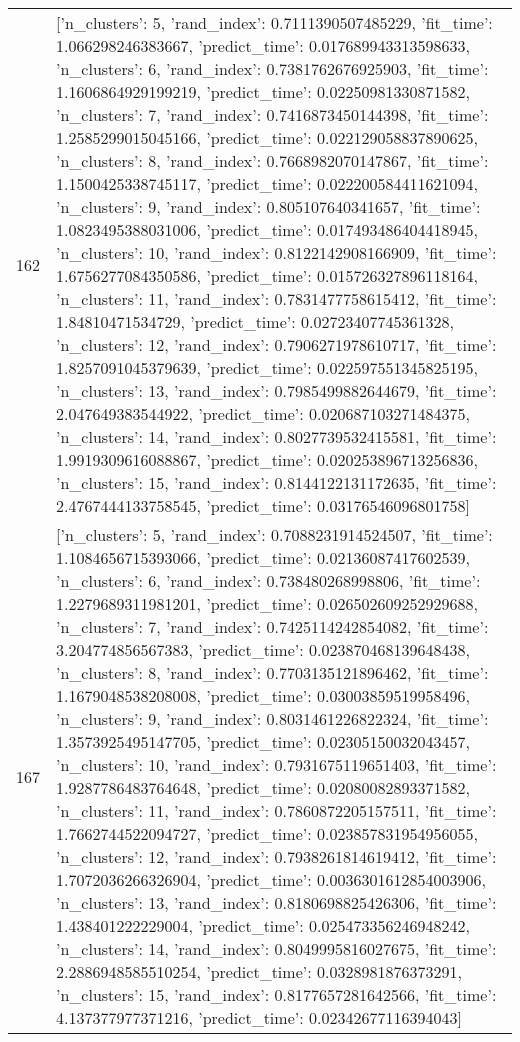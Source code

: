 \begin{tabular}{rl}
162 & [{'n_clusters': 5, 'rand_index': 0.7111390507485229, 'fit_time': 1.066298246383667, 'predict_time': 0.017689943313598633}, {'n_clusters': 6, 'rand_index': 0.7381762676925903, 'fit_time': 1.1606864929199219, 'predict_time': 0.02250981330871582}, {'n_clusters': 7, 'rand_index': 0.7416873450144398, 'fit_time': 1.2585299015045166, 'predict_time': 0.022129058837890625}, {'n_clusters': 8, 'rand_index': 0.7668982070147867, 'fit_time': 1.1500425338745117, 'predict_time': 0.022200584411621094}, {'n_clusters': 9, 'rand_index': 0.805107640341657, 'fit_time': 1.0823495388031006, 'predict_time': 0.017493486404418945}, {'n_clusters': 10, 'rand_index': 0.8122142908166909, 'fit_time': 1.6756277084350586, 'predict_time': 0.015726327896118164}, {'n_clusters': 11, 'rand_index': 0.7831477758615412, 'fit_time': 1.84810471534729, 'predict_time': 0.02723407745361328}, {'n_clusters': 12, 'rand_index': 0.7906271978610717, 'fit_time': 1.8257091045379639, 'predict_time': 0.022597551345825195}, {'n_clusters': 13, 'rand_index': 0.7985499882644679, 'fit_time': 2.047649383544922, 'predict_time': 0.020687103271484375}, {'n_clusters': 14, 'rand_index': 0.8027739532415581, 'fit_time': 1.9919309616088867, 'predict_time': 0.020253896713256836}, {'n_clusters': 15, 'rand_index': 0.8144122131172635, 'fit_time': 2.4767444133758545, 'predict_time': 0.03176546096801758}] \\
167 & [{'n_clusters': 5, 'rand_index': 0.7088231914524507, 'fit_time': 1.1084656715393066, 'predict_time': 0.02136087417602539}, {'n_clusters': 6, 'rand_index': 0.738480268998806, 'fit_time': 1.2279689311981201, 'predict_time': 0.026502609252929688}, {'n_clusters': 7, 'rand_index': 0.7425114242854082, 'fit_time': 3.204774856567383, 'predict_time': 0.023870468139648438}, {'n_clusters': 8, 'rand_index': 0.7703135121896462, 'fit_time': 1.1679048538208008, 'predict_time': 0.03003859519958496}, {'n_clusters': 9, 'rand_index': 0.8031461226822324, 'fit_time': 1.3573925495147705, 'predict_time': 0.02305150032043457}, {'n_clusters': 10, 'rand_index': 0.7931675119651403, 'fit_time': 1.9287786483764648, 'predict_time': 0.02080082893371582}, {'n_clusters': 11, 'rand_index': 0.7860872205157511, 'fit_time': 1.7662744522094727, 'predict_time': 0.023857831954956055}, {'n_clusters': 12, 'rand_index': 0.7938261814619412, 'fit_time': 1.7072036266326904, 'predict_time': 0.0036301612854003906}, {'n_clusters': 13, 'rand_index': 0.8180698825426306, 'fit_time': 1.438401222229004, 'predict_time': 0.025473356246948242}, {'n_clusters': 14, 'rand_index': 0.8049995816027675, 'fit_time': 2.2886948585510254, 'predict_time': 0.0328981876373291}, {'n_clusters': 15, 'rand_index': 0.8177657281642566, 'fit_time': 4.137377977371216, 'predict_time': 0.02342677116394043}] \\

\end{tabular}
